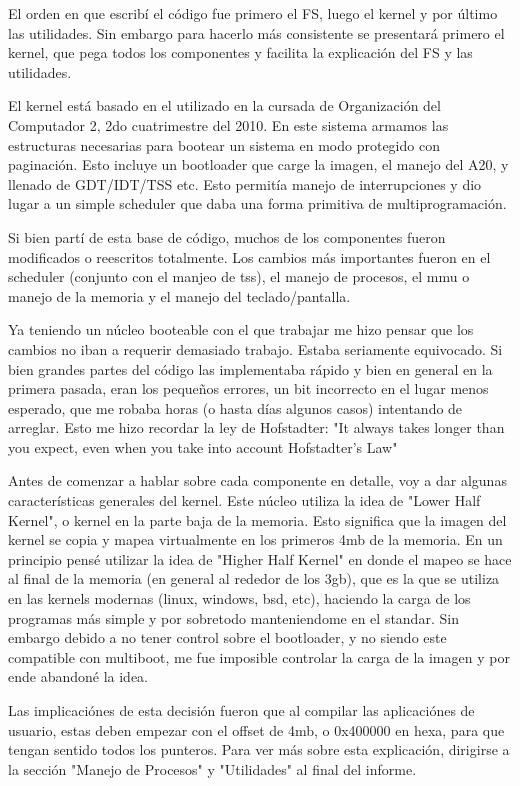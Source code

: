 El orden en que escribí el código fue primero el FS, luego el kernel y por
último las utilidades. Sin embargo para hacerlo más consistente se presentará
primero el kernel, que pega todos los componentes y facilita la explicación del
FS y las utilidades.

El kernel está basado en el utilizado en la cursada de Organización del
Computador 2, 2do cuatrimestre del 2010. En este sistema armamos las
estructuras necesarias para bootear un sistema en modo protegido con paginación.
Esto incluye un bootloader que carge la imagen, el manejo del A20, y llenado de
GDT/IDT/TSS etc. Esto permitía manejo de interrupciones y dio lugar a un simple
scheduler que daba una forma primitiva de multiprogramación.

Si bien partí de esta base de código, muchos de los componentes fueron
modificados o reescritos totalmente. Los cambios más importantes fueron en el
scheduler (conjunto con el manjeo de tss), el manejo de procesos, el mmu o
manejo de la memoria y el manejo del teclado/pantalla.

Ya teniendo un núcleo booteable con el que trabajar me hizo pensar que los
cambios no iban a requerir demasiado trabajo. Estaba seriamente equivocado. Si
bien grandes partes del código las implementaba rápido y bien en general en la
primera pasada, eran los pequeños errores, un bit incorrecto en el lugar menos
esperado, que me robaba horas (o hasta días algunos casos) intentando de
arreglar. Esto me hizo recordar la ley de Hofstadter: "It always takes longer
than you expect, even when you take into account Hofstadter's Law"

Antes de comenzar a hablar sobre cada componente en detalle, voy a dar algunas
características generales del kernel. Este núcleo utiliza la idea de "Lower
Half Kernel", o kernel en la parte baja de la memoria. Esto significa que la
imagen del kernel se copia y mapea virtualmente en los primeros 4mb de la
memoria. En un principio pensé utilizar la idea de "Higher Half Kernel" en
donde el mapeo se hace al final de la memoria (en general al rededor de los
3gb), que es la que se utiliza en las kernels modernas (linux, windows, bsd,
etc), haciendo la carga de los programas más simple y por sobretodo
manteniendome en el standar. Sin embargo debido a no tener control sobre el
bootloader, y no siendo este compatible con multiboot, me fue imposible
controlar la carga de la imagen y por ende abandoné la idea.

Las implicaciónes de esta decisión fueron que al compilar las aplicaciónes de
usuario, estas deben empezar con el offset de 4mb, o 0x400000 en hexa, para que
tengan sentido todos los punteros. Para ver más sobre esta explicación,
dirigirse a la sección "Manejo de Procesos" y "Utilidades" al final del
informe.

